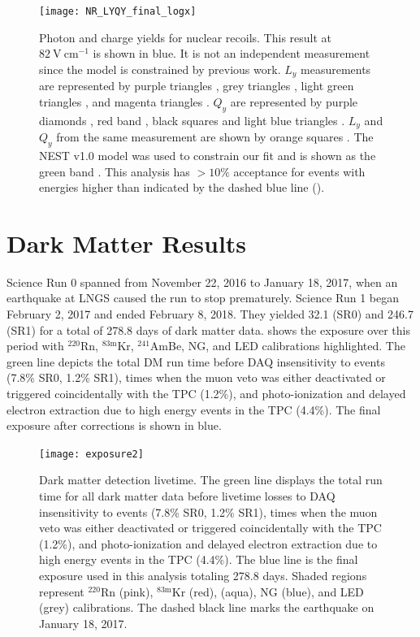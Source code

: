 \begin{figure}
\centering
\texttt{[image: NR\_LYQY\_final\_logx]}
\caption{Photon and charge yields for nuclear recoils.  This result at $82\ \mathrm{V\ cm^{-1}}$ is shown in blue.  It is not
an independent measurement since the model is constrained by previous work.  $L_y$ measurements are represented by purple triangles
, grey triangles , light green triangles , and magenta triangles
.  $Q_y$ are represented by purple diamonds , red band , black squares
 and light blue triangles .  $L_y$ and $Q_y$ from the same measurement are shown by orange
squares
.  The NEST v1.0 model was used to constrain our fit and is shown as the green band .  This
analysis has $> 10\%$ acceptance for events with energies higher than indicated by the dashed blue line
().}
\label{fig:er_nr_calibrations_results_ly_qy_nr}
\end{figure}



\section{Dark Matter Results}
\label{sec:dark_matter_results}
Science Run 0 spanned from November 22, 2016 to January 18, 2017, when an earthquake at LNGS caused the run to stop prematurely.  Science
Run 1 began February 2, 2017 and ended February 8, 2018.  They
yielded 32.1 (SR0) and 246.7 (SR1) for a total of 278.8 days of dark matter data.   shows the
exposure over this period with $^{220}$Rn, $^{83\mathrm{m}}$Kr, $^{241}$AmBe, NG, and LED calibrations highlighted.  The green line
depicts the total DM run time before DAQ insensitivity to events (7.8\% SR0, 1.2\% SR1), times when the muon veto was either
deactivated or triggered coincidentally with the TPC (1.2\%), and photo-ionization and delayed electron extraction due to high energy
events in the TPC (4.4\%).  The final exposure after corrections is shown in blue.

\begin{figure}
\centering
\texttt{[image: exposure2]}
\caption{Dark matter detection livetime.  The green line displays the total run time for all dark matter data before
livetime losses to DAQ insensitivity to events (7.8\% SR0, 1.2\% SR1), times when the muon veto was either
deactivated or triggered coincidentally with the TPC (1.2\%), and photo-ionization and delayed electron extraction due to high energy
events in the TPC (4.4\%).  The blue line is the final exposure used in this analysis totaling 278.8 days.  Shaded regions represent
$^{220}$Rn (pink), $^{83\mathrm{m}}$Kr (red), \ambe (aqua), NG (blue), and LED (grey) calibrations.  The dashed black line marks the
earthquake on January 18, 2017.}
\label{fig:dark_matter_results_exposure}
\end{figure}



